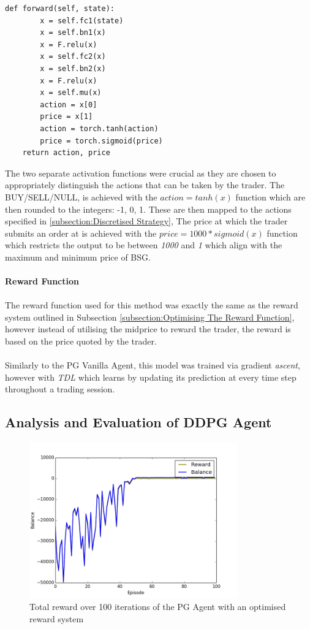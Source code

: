\documentclass[ %
                    author={Ashwinder Khurana},
                supervisor={Prof Dave Cliff},
                    degree={MEng},
                     title={The Deeply Reinforced Trader},
                  subtitle={},
                      type={enterprise},
                      year={2020} ]{dissertation}
\begin{document}
{\begin{lstlisting}[label=actor-forward-pass, caption = Forward pass for the Actor Model]
def forward(self, state):
        x = self.fc1(state)
        x = self.bn1(x)
        x = F.relu(x)
        x = self.fc2(x)
        x = self.bn2(x)
        x = F.relu(x)
        x = self.mu(x)
        action = x[0]
        price = x[1]
        action = torch.tanh(action)
        price = torch.sigmoid(price)
	return action, price
\end{lstlisting}
\noindent
The two separate activation functions were crucial as they are chosen to appropriately distinguish the actions that can be taken by the trader. The BUY/SELL/NULL, is achieved with the $action = tanh(x)$ function which are then rounded to the integers: -1, 0, 1. These are then mapped to the actions specified in \ref{subsection:Discretised Strategy}, The price at which the trader submits an order at is achieved with the $price = 1000*sigmoid(x)$ function which restricts the output to be between \textit{1000} and \textit{1} which align with the maximum and minimum price of BSG. 
\\
\\
\textbf{Reward Function}
\\
\\
\noindent
The reward function used for this method was exactly the same as the reward system outlined in Subsection \ref{subsection:Optimising The Reward Function}, however instead of utilising the midprice to reward the trader, the reward is based on the price quoted by the trader. 
\\
\\
\noindent
Similarly to the PG Vanilla Agent, this model was trained via gradient \textit{ascent}, however with \textit{TDL} which learns by updating its prediction at every time step throughout a trading session. 
\subsection{Analysis and Evaluation of DDPG Agent}
\label{subsection:Analysis and Evaluation of PG Vanilla}
\begin{figure}[H]
	\centering
  	\includegraphics[width=0.8\textwidth]{PG-Vanilla-Reward.png}
  	\caption{Total reward over 100 iterations of the PG Agent with an optimised reward system }
	\label{fig:DDPG-Balance}  
\end{figure}




}
\end{document}
